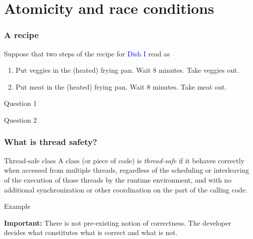 \documentclass[xcolor={dvipsnames,svgnames},aspectratio=169]{beamer}
\begin{document}
\section{Atomicity and race conditions}

\begin{frame}[fragile]
  \frametitle{A recipe}

  Suppose that two steps of the recipe for \textcolor{blue}{Dish I} read as
  \begin{enumerate}
    \item Put veggies in the (heated) frying pan. Wait 8 minutes. Take veggies
      out.
    \item Put meat in the (heated) frying pan. Wait 8 minutes. Take meat out.
    \end{enumerate}
    \vspace{0.6cm}
    \begin{block}{Question 1}
    \end{block}
    \begin{block}{Question 2}
    \end{block}
\end{frame}

\begin{frame}[fragile]
  \frametitle{What is thread safety?}

  \begin{block}{Thread-safe class}
    A class (or piece of code) is \emph{thread-safe} if it behaves correctly
    when accessed from multiple threads, regardless of the scheduling or
    interleaving of the execution of those threads by the runtime environment,
    and with no additional synchronization or other coordination on the part of
    the calling code.
  \end{block}

  \vspace{1cm}
  \begin{block}{Example}
  \end{block}
\end{frame}

\begin{frame}[fragile]
  \large{\textbf{Important:} There is not pre-existing notion of correctness.
    The developer decides what constitutes what is correct and what is not.}
\end{frame}
\end{document}
